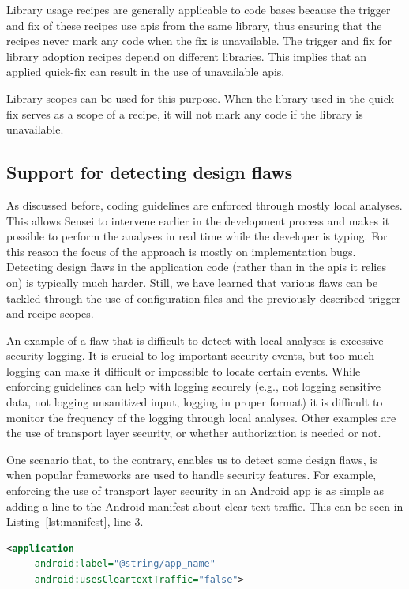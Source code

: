 Library usage recipes are generally applicable to code bases because the trigger and fix of these recipes use \glspl{api} from the same library, thus ensuring that the recipes never mark any code when the fix is unavailable.
The trigger and fix for library adoption recipes depend on different libraries.
This implies that an applied quick-fix can result in the use of unavailable \glspl{api}. 

Library scopes can be used for this purpose.
When the library used in the quick-fix serves as a scope of a recipe, it will not mark any code if the library is unavailable.

\subsection{Support for detecting design flaws}
As discussed before, coding guidelines are enforced through mostly local analyses.
This allows Sensei to intervene earlier in the development process and makes it possible to perform the analyses in real time while the developer is typing.
For this reason the focus of the approach is mostly on implementation bugs.
Detecting design flaws in the application code (rather than in the \glspl{api} it relies on) is typically much harder.
Still, we have learned that various flaws can be tackled through the use of configuration files and the previously described trigger and recipe scopes.

An example of a flaw that is difficult to detect with local analyses is excessive security logging.
It is crucial to log important security events, but too much logging can make it difficult or impossible to locate certain events.
While enforcing guidelines can help with logging securely (e.g., not logging sensitive data, not logging unsanitized input, logging in proper format) it is difficult to monitor the frequency of the logging through local analyses.
Other examples are the use of transport layer security, or whether authorization is needed or not.

One scenario that, to the contrary, enables us to detect some design flaws, is when popular frameworks are used to handle security features.
For example, enforcing the use of transport layer security in an Android app is as simple as adding a line to the Android manifest about clear text traffic.
This can be seen in Listing~\ref{lst:manifest}, line 3.

\begin{lstlisting}[language={XML},caption={When the attribute \texttt{usesCleartextTraffic} is added to the Android manifest with value \texttt{false}, the Android \gls{os} will ensure that transport layer security is used for the communication with this application.},float,label={lst:manifest},abovecaptionskip=-0.5pt]
<application
     android:label="@string/app_name"
     android:usesCleartextTraffic="false">
\end{lstlisting}

